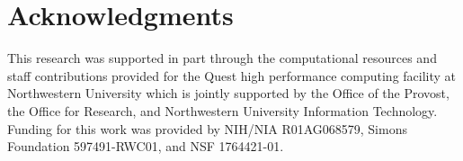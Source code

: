 
\section{Acknowledgments}
This research was supported in part through the computational resources and staff contributions provided for the Quest high performance computing facility at Northwestern University which is jointly supported by the Office of the Provost, the Office for Research, and Northwestern University Information Technology. 
%
Funding for this work was provided by NIH/NIA R01AG068579, Simons Foundation 597491-RWC01, and NSF 1764421-01.


